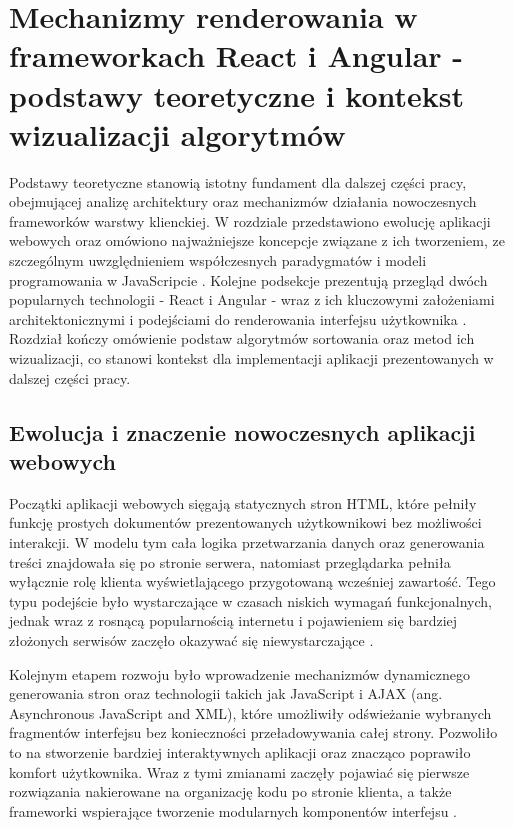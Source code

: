 \documentclass[12pt,openright,twoside]{report}
\begin{document}
\chapter{Mechanizmy renderowania w frameworkach React i Angular - podstawy teoretyczne i kontekst wizualizacji algorytmów}
Podstawy teoretyczne stanowią istotny fundament dla dalszej części pracy, obejmującej analizę architektury oraz mechanizmów działania nowoczesnych frameworków warstwy klienckiej. W rozdziale przedstawiono ewolucję aplikacji webowych oraz omówiono najważniejsze koncepcje związane z ich tworzeniem, ze szczególnym uwzględnieniem współczesnych paradygmatów i modeli programowania w JavaScripcie \cite{Flanagan_JS}. Kolejne podsekcje prezentują przegląd dwóch popularnych technologii - React i Angular - wraz z ich kluczowymi założeniami architektonicznymi i podejściami do renderowania interfejsu użytkownika \cite{React_Up_Running}. Rozdział kończy omówienie podstaw algorytmów sortowania oraz metod ich wizualizacji, co stanowi kontekst dla implementacji aplikacji prezentowanych w dalszej części pracy.

\section{Ewolucja i znaczenie nowoczesnych aplikacji webowych}
Początki aplikacji webowych sięgają statycznych stron HTML, które pełniły funkcję prostych dokumentów prezentowanych użytkownikowi bez możliwości interakcji. W modelu tym cała logika przetwarzania danych oraz generowania treści znajdowała się po stronie serwera, natomiast przeglądarka pełniła wyłącznie rolę klienta wyświetlającego przygotowaną wcześniej zawartość. Tego typu podejście było wystarczające w czasach niskich wymagań funkcjonalnych, jednak wraz z rosnącą popularnością internetu i pojawieniem się bardziej złożonych serwisów zaczęło okazywać się niewystarczające \cite{Flanagan_JS}.

Kolejnym etapem rozwoju było wprowadzenie mechanizmów dynamicznego generowania stron oraz technologii takich jak JavaScript i AJAX (ang. Asynchronous JavaScript and XML), które umożliwiły odświeżanie wybranych fragmentów interfejsu bez konieczności przeładowywania całej strony. Pozwoliło to na stworzenie bardziej interaktywnych aplikacji oraz znacząco poprawiło komfort użytkownika. Wraz z tymi zmianami zaczęły pojawiać się pierwsze rozwiązania nakierowane na organizację kodu po stronie klienta, a także frameworki wspierające tworzenie modularnych komponentów interfejsu \cite{Practical_Modern_JS}.
\end{document}
